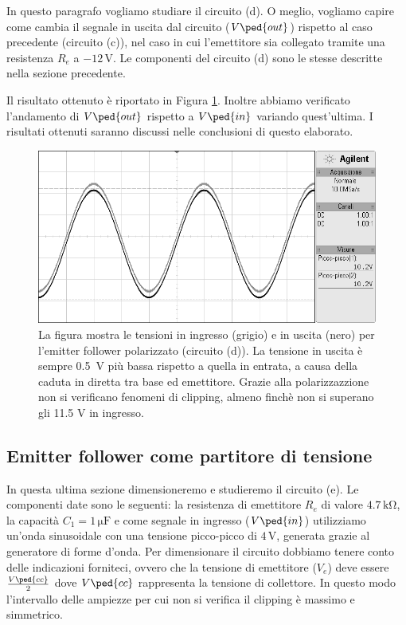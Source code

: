 In questo paragrafo vogliamo studiare il circuito (d). O meglio, vogliamo capire come cambia il segnale in uscita dal circuito ($V\ped{out}$) rispetto al caso precedente (circuito (c)), nel caso in cui l'emettitore sia collegato tramite una resistenza $R_e$ a $-12\,\si{\volt}$.
Le componenti del circuito (d) sono le stesse descritte nella sezione precedente.

Il risultato ottenuto è riportato in Figura \ref{fig:emitter_b}.
Inoltre abbiamo verificato l'andamento di $V\ped{out}$ rispetto a $V\ped{in}$ variando quest'ultima. I risultati ottenuti saranno discussi nelle conclusioni di questo elaborato.

\begin{figure}
    \includegraphics[scale=0.5]{emitter_b.png}
    \caption{La figura mostra le tensioni in ingresso (grigio) e in uscita (nero) per l'emitter follower polarizzato
        (circuito (d)). La tensione in uscita è sempre \SI{0.5}{\volt} più bassa rispetto a
        quella in entrata, a causa della caduta in diretta tra base ed emettitore. Grazie alla polarizzazzione
        non si verificano fenomeni di clipping, almeno finchè non si superano gli 11.5 V in ingresso.}
    \label{fig:emitter_b}
\end{figure}

\subsection*{Emitter follower come partitore di tensione}

In questa ultima sezione dimensioneremo e studieremo il circuito (e). Le componenti date sono le seguenti: la resistenza di emettitore $R_e$ di valore $4.7\,\si{\kilo\ohm}$, la capacità $C_1=1\,\si{\micro\farad}$ e come segnale in ingresso ($V\ped{in}$) utilizziamo un'onda sinusoidale con una tensione picco-picco di $4\,\si{\volt}$, generata grazie al generatore di forme d'onda.
Per dimensionare il circuito dobbiamo tenere conto delle indicazioni forniteci, ovvero che la tensione di emettitore ($V_e$) deve essere $\frac{V\ped{cc}}{2}$ dove $V\ped{cc}$ rappresenta la tensione di collettore. In questo modo l'intervallo delle ampiezze per cui non si verifica il clipping è massimo e simmetrico.

